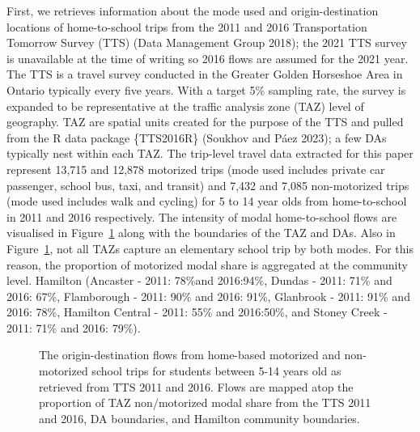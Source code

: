 \documentclass[
default
]{sn-jnl}
\begin{document}
First, we retrieves information about the mode used and
origin-destination locations of home-to-school trips from the 2011 and
2016 Transportation Tomorrow Survey (TTS) (Data Management Group 2018);
the 2021 TTS survey is unavailable at the time of writing so 2016 flows
are assumed for the 2021 year. The TTS is a travel survey conducted in
the Greater Golden Horseshoe Area in Ontario typically every five years.
With a target 5\% sampling rate, the survey is expanded to be
representative at the traffic analysis zone (TAZ) level of geography.
TAZ are spatial units created for the purpose of the TTS and pulled from
the R data package \{TTS2016R\} (Soukhov and Páez 2023); a few DAs
typically nest within each TAZ. The trip-level travel data extracted for
this paper represent 13,715 and 12,878 motorized trips (mode used
includes private car passenger, school bus, taxi, and transit) and 7,432
and 7,085 non-motorized trips (mode used includes walk and cycling) for
5 to 14 year olds from home-to-school in 2011 and 2016 respectively. The
intensity of modal home-to-school flows are visualised in
Figure~\ref{fig-Fig4} along with the boundaries of the TAZ and DAs. Also
in Figure~\ref{fig-Fig4}, not all TAZs capture an elementary school trip
by both modes. For this reason, the proportion of motorized modal share
is aggregated at the community level. Hamilton (Ancaster - 2011: 78\%and
2016:94\%, Dundas - 2011: 71\% and 2016: 67\%, Flamborough - 2011: 90\%
and 2016: 91\%, Glanbrook - 2011: 91\% and 2016: 78\%, Hamilton Central
- 2011: 55\% and 2016:50\%, and Stoney Creek - 2011: 71\% and 2016:
79\%).

\begin{figure}[H]


\caption{\label{fig-Fig4}The origin-destination flows from home-based
motorized and non-motorized school trips for students between 5-14 years
old as retrieved from TTS 2011 and 2016. Flows are mapped atop the
proportion of TAZ non/motorized modal share from the TTS 2011 and 2016,
DA boundaries, and Hamilton community boundaries.}

\end{figure}%
\end{document}
